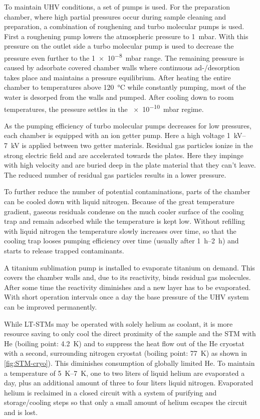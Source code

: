 To maintain UHV conditions, a set of pumps is used. For the preparation chamber, where high partial pressures occur during sample cleaning and preparation, a combination of roughening and turbo molecular pumps is used. First a roughening pump lowers the atmospheric pressure to \SI{1}{\milli \bar}. With this pressure on the outlet side a turbo molecular pump is used to decrease the pressure even further to the  \SI{1e-8}{\milli \bar} range. The remaining pressure is caused by adsorbate covered chamber walls where continuous ad-/desorption takes place and maintains a pressure equilibrium. After heating the entire chamber to temperatures above \SI{120}{\celsius} while constantly pumping, most of the water is desorped from the walls and pumped. After cooling down to room temperatures, the pressure settles in the \SI{e-10}{\milli \bar} regime. 

As the pumping efficiency of turbo molecular pumps decreases for low pressures, each chamber is equipped with an ion getter pump. Here a high voltage \SIrange{1}{7}{\kilo \volt} is applied between two getter materials. Residual gas particles ionize in the strong electric field and are accelerated towards the plates. Here they impinge with high velocity and are buried deep in the plate material that they can't leave. The reduced number of residual gas particles results in a lower pressure.

To further reduce the number of potential contaminations, parts of the chamber can be cooled down with liquid nitrogen. Because of the great temperature gradient, gaseous residuals condense on the much cooler surface of the cooling trap and remain adsorbed while the temperature is kept low. Without refilling with liquid nitrogen the temperature slowly increases over time, so that the cooling trap looses pumping efficiency over time (usually after \SIrange{1}{2}{\hour}) and starts to release trapped contaminants.

A titanium sublimation pump is installed to evaporate titanium on demand. This covers the chamber walls and, due to its reactivity, binds residual gas molecules. After some time the reactivity diminishes and a new layer has to be evaporated. With short operation intervals once a day the base pressure of the UHV system can be improved permanently.

While LT-STMs may be operated with solely helium as coolant, it is more resource saving to only cool the direct proximity of the sample and the STM with He (boiling point: \SI{4.2}{\K}) and to suppress the heat flow out of the He cryostat with a second, surrounding nitrogen cryostat (boiling point: \SI{77}{\K}) as shown in \autoref{fig:STM-cryo}). This diminishes consumption of globally limited He. To maintain a temperature of \SIrange{5}{7}{\K}, one to two liters of liquid helium are evaporated a day, plus an additional amount of three to four liters liquid nitrogen. Evaporated helium is reclaimed in a closed circuit with a system of purifying and storage/cooling steps so that only a small amount of helium escapes the circuit and is lost.

